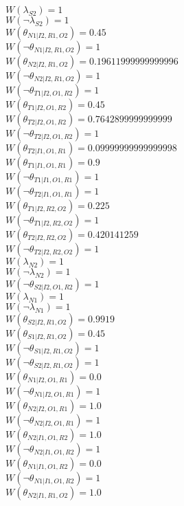 $W(\lambda_{S2})=1$\\
$W(\neg\lambda_{S2})=1$\\
$W(\theta_{N1|I2,R1,O2})=0.45$\\
$W(\neg\theta_{N1|I2,R1,O2})=1$\\
$W(\theta_{N2|I2,R1,O2})=0.19611999999999996$\\
$W(\neg\theta_{N2|I2,R1,O2})=1$\\
$W(\neg\theta_{T1|I2,O1,R2})=1$\\
$W(\theta_{T1|I2,O1,R2})=0.45$\\
$W(\theta_{T2|I2,O1,R2})=0.7642899999999999$\\
$W(\neg\theta_{T2|I2,O1,R2})=1$\\
$W(\theta_{T2|I1,O1,R1})=0.09999999999999998$\\
$W(\theta_{T1|I1,O1,R1})=0.9$\\
$W(\neg\theta_{T1|I1,O1,R1})=1$\\
$W(\neg\theta_{T2|I1,O1,R1})=1$\\
$W(\theta_{T1|I2,R2,O2})=0.225$\\
$W(\neg\theta_{T1|I2,R2,O2})=1$\\
$W(\theta_{T2|I2,R2,O2})=0.420141259$\\
$W(\neg\theta_{T2|I2,R2,O2})=1$\\
$W(\lambda_{N2})=1$\\
$W(\neg\lambda_{N2})=1$\\
$W(\neg\theta_{S2|I2,O1,R2})=1$\\
$W(\lambda_{N1})=1$\\
$W(\neg\lambda_{N1})=1$\\
$W(\theta_{S2|I2,R1,O2})=0.9919$\\
$W(\theta_{S1|I2,R1,O2})=0.45$\\
$W(\neg\theta_{S1|I2,R1,O2})=1$\\
$W(\neg\theta_{S2|I2,R1,O2})=1$\\
$W(\theta_{N1|I2,O1,R1})=0.0$\\
$W(\neg\theta_{N1|I2,O1,R1})=1$\\
$W(\theta_{N2|I2,O1,R1})=1.0$\\
$W(\neg\theta_{N2|I2,O1,R1})=1$\\
$W(\theta_{N2|I1,O1,R2})=1.0$\\
$W(\neg\theta_{N2|I1,O1,R2})=1$\\
$W(\theta_{N1|I1,O1,R2})=0.0$\\
$W(\neg\theta_{N1|I1,O1,R2})=1$\\
$W(\theta_{N2|I1,R1,O2})=1.0$\\
